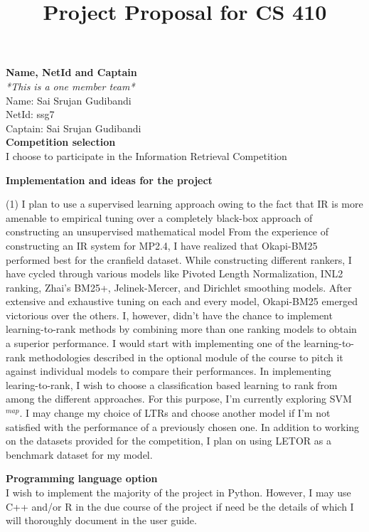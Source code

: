 \documentclass{exam}
\begin{document}
\title{Project Proposal for CS 410}
\maketitle
\begin{questions}
\question
	\textbf{Name, NetId and Captain}
	\\\textit{*This is a one member team*} \\
	Name: Sai Srujan Gudibandi \\
	NetId: ssg7 \\
	Captain: Sai Srujan Gudibandi \\
\question
	\textbf{Competition selection}
	\\ I choose to participate in the Information Retrieval Competition

\question
	\textbf{Implementation and ideas for the project}
	\begin{tasks}(1)
		\task[i)] I plan to use a supervised learning approach owing to the fact that IR is more amenable to empirical tuning over a completely black-box approach of constructing an unsupervised mathematical model 
		\task[ii)] From the experience of constructing an IR system for MP2.4, I have realized that Okapi-BM25 performed best for the cranfield dataset. While constructing different rankers, I have cycled through various models like Pivoted Length Normalization, INL2 ranking, Zhai's BM25+, Jelinek-Mercer, and Dirichlet smoothing models. After extensive and exhaustive tuning on each and every model, Okapi-BM25 emerged victorious over the others. I, however, didn't have the chance to implement learning-to-rank methods by combining more than one ranking models to obtain a superior performance. I would start with implementing one of the learning-to-rank methodologies described in the optional module of the course to pitch it against individual models to compare their performances.  
		\task[iii)] In implementing learing-to-rank, I wish to choose a classification based learning to rank from among the different approaches. For this purpose, I'm currently exploring SVM$^{map}$. I may change my choice of LTRs and choose another model if I'm not satisfied with the performance of a previously chosen one. In addition to working on the datasets provided for the competition, I plan on using LETOR as a benchmark dataset for my model.
	\end{tasks} 
\question
	\textbf{Programming language option}
	\\ I wish to implement the majority of the project in Python. However, I may use C++ and/or R in the due course of the project if need be the details of which I will thoroughly document in the user guide.

\end{questions}
\end{document}
